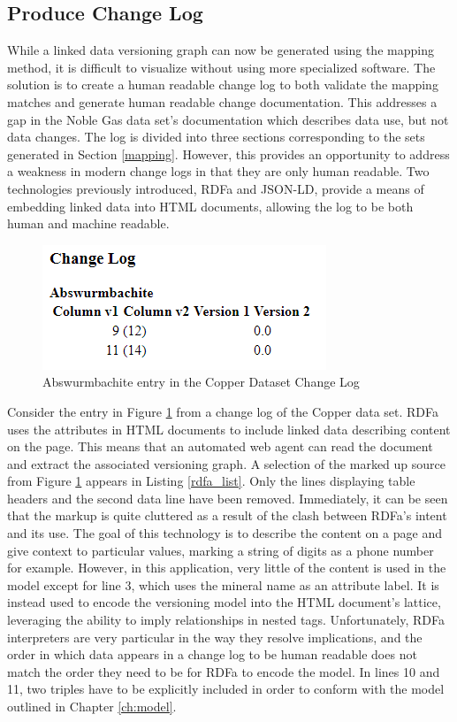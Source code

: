 \subsection{Produce Change Log}

While a linked data versioning graph can now be generated using the mapping method, it is difficult to visualize without using more specialized software.
The solution is to create a human readable change log to both validate the mapping matches and generate human readable change documentation.
This addresses a gap in the Noble Gas data set's documentation which describes data use, but not data changes.
The log is divided into three sections corresponding to the sets generated in Section \ref{mapping}.
However, this provides an opportunity to address a weakness in modern change logs in that they are only human readable.
Two technologies previously introduced, RDFa and JSON-LD, provide a means of embedding linked data into HTML documents, allowing the log to be both human and machine readable.

\begin{figure}
	\centering
	\includegraphics[scale=0.80]{figures/Changelog-zoomed.png}
	\caption{Abswurmbachite entry in the Copper Dataset Change Log}
	\label{changelog_zoomed}
\end{figure}

Consider the entry in Figure \ref{changelog_zoomed} from a change log of the Copper data set.
RDFa uses the attributes in HTML documents to include linked data describing content on the page.
This means that an automated web agent can read the document and extract the associated versioning graph.
A selection of the marked up source from Figure \ref{changelog_zoomed} appears in Listing \ref{rdfa_list}.
Only the lines displaying table headers and the second data line have been removed.
Immediately, it can be seen that the markup is quite cluttered as a result of the clash between RDFa's intent and its use.
The goal of this technology is to describe the content on a page and give context to particular values, marking a string of digits as a phone number for example.
However, in this application, very little of the content is used in the model except for line 3, which uses the mineral name as an attribute label.
It is instead used to encode the versioning model into the HTML document's lattice, leveraging the ability to imply relationships in nested tags.
Unfortunately, RDFa interpreters are very particular in the way they resolve implications, and the order in which data appears in a change log to be human readable does not match the order they need to be for RDFa to encode the model.
In lines 10 and 11, two triples have to be explicitly included in order to conform with the model outlined in Chapter \ref{ch:model}.

